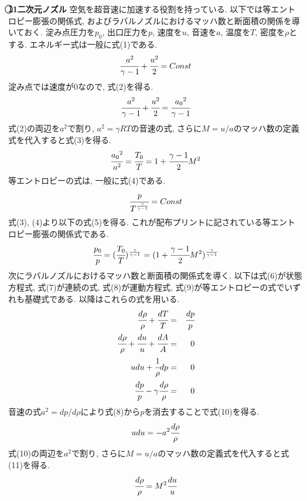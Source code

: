 \documentclass[12pt]{jsarticle}
\begin{document}
{\bf \textcircled{\scriptsize11}二次元ノズル} \newline
空気を超音速に加速する役割を持っている. 以下では等エントロピー膨張の関係式, およびラバルノズルにおけるマッハ数と断面積の関係を導いておく. 淀み点圧力を$p_0$, 出口圧力を$p$, 速度を$u$, 音速を$a$, 温度を$T$, 密度を$\rho$とする. エネルギー式は一般に式(1)である.
\begin{eqnarray}
\cfrac{a^2}{\gamma - 1} + \cfrac{u^2}{2} = Const
\end{eqnarray}
淀み点では速度が0なので, 式(2)を得る.
\begin{eqnarray}
\cfrac{a^2}{\gamma - 1} + \cfrac{u^2}{2} = \cfrac{{a_0}^2}{\gamma - 1}
\end{eqnarray}
式(2)の両辺を$a^2$で割り, $a^2=\gamma RT$の音速の式, さらに$M=u/a$のマッハ数の定義式を代入すると式(3)を得る.
\begin{eqnarray}
\cfrac{{a_0}^2}{a^2} = \cfrac{T_0}{T} = 1 + \cfrac{\gamma - 1}{2} M^2
\end{eqnarray}
等エントロピーの式は, 一般に式(4)である.
\begin{eqnarray}
\cfrac{p}{T^{\frac{\gamma}{\gamma - 1}}} = Const
\end{eqnarray}
式(3), (4)より以下の式(5)を得る. これが配布プリントに記されている等エントロピー膨張の関係式である.
\begin{eqnarray}
\cfrac{p_0}{p} = (\cfrac{T_0}{T})^{\frac{\gamma}{\gamma - 1}} = (1 + \cfrac{\gamma - 1}{2}M^2)^{\frac{\gamma}{\gamma-1}}
\end{eqnarray}
次にラバルノズルにおけるマッハ数と断面積の関係式を導く. 以下は式(6)が状態方程式, 式(7)が連続の式, 式(8)が運動方程式, 式(9)が等エントロピーの式でいずれも基礎式である. 以降はこれらの式を用いる.
\begin{eqnarray}
\cfrac{d\rho}{\rho} + \cfrac{dT}{T} &=& \cfrac{dp}{p} \\
\cfrac{d\rho}{\rho} + \cfrac{du}{u} + \cfrac{dA}{A} &=& 0 \\
udu + \cfrac{1}{\rho}dp &=& 0 \\
\cfrac{dp}{p} - \gamma \cfrac{d\rho}{\rho} &=& 0
\end{eqnarray}
音速の式$a^2 = dp/d\rho$により式(8)から$p$を消去することで式(10)を得る.
\begin{eqnarray}
udu = -a^2 \cfrac{d\rho}{\rho}
\end{eqnarray}
式(10)の両辺を$a^2$で割り, さらに$M=u/a$のマッハ数の定義式を代入すると式(11)を得る.
\begin{eqnarray}
\cfrac{d\rho}{\rho} = M^2 \cfrac{du}{u}
\end{eqnarray}
\end{document}
